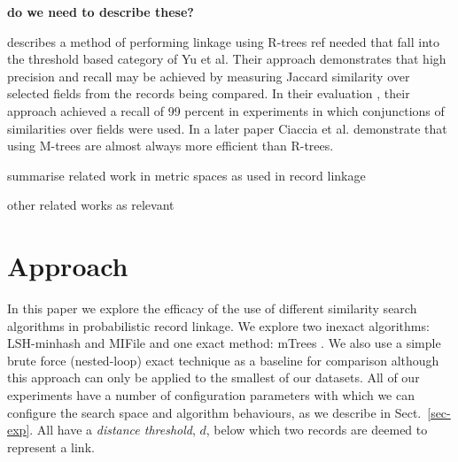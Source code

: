 \documentclass{llncs}
\begin{document}
{\textbf{do we need to describe these?}}

 \cite{Li2006} describes a method of performing linkage using R-trees {ref needed} that fall into the threshold based category of Yu et al. Their approach demonstrates that high precision and recall may be achieved by measuring Jaccard similarity over selected fields from the records being compared. In their evaluation , their approach achieved a recall of 99 percent in experiments in which conjunctions of similarities over fields were used. In a later paper \cite{Ciaccia97indexingmetric}  Ciaccia et al. demonstrate that using M-trees are almost always more efficient than R-trees.

summarise related work in metric spaces as used in record linkage

other related works as relevant




\section{Approach}
\label{sec-approach}


In this paper we explore the efficacy of the use of different
similarity search algorithms in probabilistic record linkage.
We explore two inexact algorithms: LSH-minhash and MIFile \cite{amato2014mi} and one exact method: mTrees \cite{paolociaccia2m}. 
We also use a simple brute force (nested-loop) exact technique as a 
baseline for comparison although this approach can only be applied to 
the smallest of our datasets. All of our experiments have a number of 
configuration parameters with which we can configure the search space and algorithm behaviours, as we describe in Sect.~\ref{sec-exp}. All
have a \emph{distance threshold}, $d$, below which two records are
deemed to represent a link.
\end{document}
